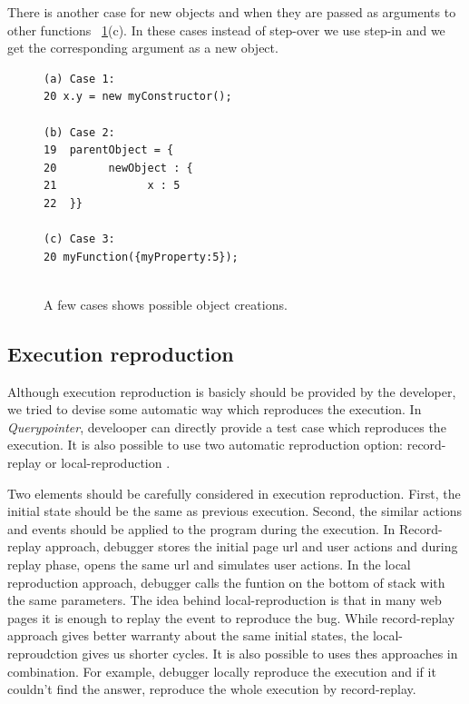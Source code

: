 \documentclass[preprint]{sigplanconf}
\begin{document}
There is another case for new objects and when they are passed as arguments to other functions ~\ref{fig:objectCreation}(c). In these cases instead of step-over we use step-in and we get the corresponding argument as a new object.


\begin{figure}[htp]
\begin{verbatim}
(a) Case 1:
20 x.y = new myConstructor();

(b) Case 2:
19  parentObject = {
20   	  newObject : {
21  			x : 5
22  }}

(c) Case 3:
20 myFunction({myProperty:5});
 
\end{verbatim}
\caption{A few cases shows possible object creations.}
\label{fig:objectCreation}
\end{figure}

  
\subsection{Execution reproduction}
Although execution reproduction is basicly should be provided by the developer, we tried to devise some automatic way which reproduces the execution. In \textit{Querypointer}, develooper can directly provide a test case which reproduces the execution. It is also possible to use two automatic reproduction option: record-replay or local-reproduction .

Two elements should be carefully considered in execution reproduction. First, the initial state should be the same as previous execution. Second, the similar actions and events should be applied to the program during the execution. In Record-replay approach, debugger stores the initial page url and user actions and during replay phase, opens the same url and simulates user actions. In the local reproduction approach, debugger calls the funtion on the bottom of stack with the same parameters. The idea behind local-reproduction is that in many web pages it is enough to replay the event to reproduce the bug. While record-replay approach gives better warranty about the same initial states, the local-reproudction gives us shorter cycles. It is also possible to uses thes approaches in combination. For example, debugger locally reproduce the execution and if it couldn't find the answer, reproduce the whole execution by record-replay.
\end{document}
